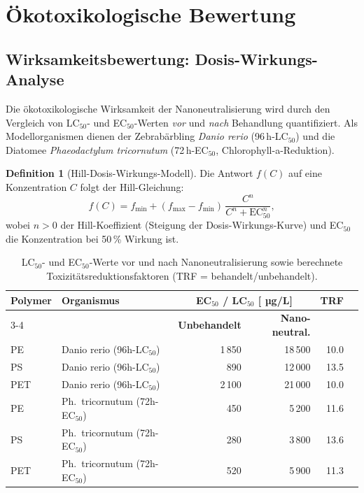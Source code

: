 ﻿\documentclass[12pt,a4paper]{article}
\theoremstyle{definition}
\newtheorem{definition}{Definition}[section]
\theoremstyle{remark}
\begin{document}
\section{Ökotoxikologische Bewertung}
\label{sec:oekotox}

\subsection{Wirksamkeitsbewertung: Dosis-Wirkungs-Analyse}

Die ökotoxikologische Wirksamkeit der Nanoneutralisierung wird durch den
Vergleich von LC$_{50}$- und EC$_{50}$-Werten \emph{vor} und \emph{nach}
Behandlung quantifiziert. Als Modellorganismen dienen der Zebrabärbling
\textit{Danio rerio} (96\,h-LC$_{50}$) und die Diatomee \textit{Phaeodactylum
tricornutum} (72\,h-EC$_{50}$, Chlorophyll-a-Reduktion).

\begin{definition}[Hill-Dosis-Wirkungs-Modell]
\label{def:hill}
Die Antwort $f(C)$ auf eine Konzentration $C$ folgt der Hill-Gleichung:
\begin{equation}
  f(C) = f_{\min} + (f_{\max} - f_{\min})\,\frac{C^n}{C^n + \text{EC}_{50}^n},
  \label{eq:hill}
\end{equation}
wobei $n > 0$ der Hill-Koeffizient (Steigung der Dosis-Wirkungs-Kurve) und
EC$_{50}$ die Konzentration bei 50\,\% Wirkung ist.
\end{definition}

\begin{table}[H]
\centering
\caption{LC$_{50}$- und EC$_{50}$-Werte vor und nach Nanoneutralisierung sowie
  berechnete Toxizitätsreduktionsfaktoren (TRF = behandelt/unbehandelt).}
\label{tab:oekotox}
\begin{tabular}{llrrrr}
\toprule
\textbf{Polymer} & \textbf{Organismus} & \multicolumn{2}{c}{\textbf{EC$_{50}$ / LC$_{50}$ [ µg/L]}} & \textbf{TRF} \\
\cmidrule(lr){3-4}
 & & \textbf{Unbehandelt} & \textbf{Nano-neutral.} & \\
\midrule
PE  & Danio rerio (96h-LC$_{50}$)   & 1\,850 & 18\,500 & 10.0 \\
PS  & Danio rerio (96h-LC$_{50}$)   &   890  & 12\,000 & 13.5 \\
PET & Danio rerio (96h-LC$_{50}$)   & 2\,100 & 21\,000 & 10.0 \\
PE  & Ph.\ tricornutum (72h-EC$_{50}$) & 450  & 5\,200  & 11.6 \\
PS  & Ph.\ tricornutum (72h-EC$_{50}$) & 280  & 3\,800  & 13.6 \\
PET & Ph.\ tricornutum (72h-EC$_{50}$) & 520  & 5\,900  & 11.3 \\
\bottomrule
\end{tabular}
\end{table}
\end{document}
